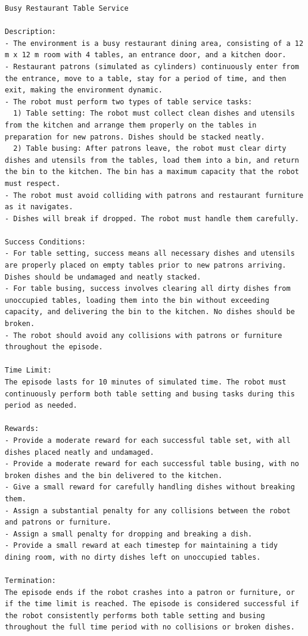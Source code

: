 \begin{lstlisting}[language={}]
Busy Restaurant Table Service

Description: 
- The environment is a busy restaurant dining area, consisting of a 12 m x 12 m room with 4 tables, an entrance door, and a kitchen door.
- Restaurant patrons (simulated as cylinders) continuously enter from the entrance, move to a table, stay for a period of time, and then exit, making the environment dynamic.
- The robot must perform two types of table service tasks:
  1) Table setting: The robot must collect clean dishes and utensils from the kitchen and arrange them properly on the tables in preparation for new patrons. Dishes should be stacked neatly.
  2) Table busing: After patrons leave, the robot must clear dirty dishes and utensils from the tables, load them into a bin, and return the bin to the kitchen. The bin has a maximum capacity that the robot must respect.
- The robot must avoid colliding with patrons and restaurant furniture as it navigates.
- Dishes will break if dropped. The robot must handle them carefully.

Success Conditions:
- For table setting, success means all necessary dishes and utensils are properly placed on empty tables prior to new patrons arriving. Dishes should be undamaged and neatly stacked.
- For table busing, success involves clearing all dirty dishes from unoccupied tables, loading them into the bin without exceeding capacity, and delivering the bin to the kitchen. No dishes should be broken.
- The robot should avoid any collisions with patrons or furniture throughout the episode.

Time Limit:
The episode lasts for 10 minutes of simulated time. The robot must continuously perform both table setting and busing tasks during this period as needed.

Rewards:
- Provide a moderate reward for each successful table set, with all dishes placed neatly and undamaged.
- Provide a moderate reward for each successful table busing, with no broken dishes and the bin delivered to the kitchen.
- Give a small reward for carefully handling dishes without breaking them.
- Assign a substantial penalty for any collisions between the robot and patrons or furniture.
- Assign a small penalty for dropping and breaking a dish.
- Provide a small reward at each timestep for maintaining a tidy dining room, with no dirty dishes left on unoccupied tables.

Termination:
The episode ends if the robot crashes into a patron or furniture, or if the time limit is reached. The episode is considered successful if the robot consistently performs both table setting and busing throughout the full time period with no collisions or broken dishes.
\end{lstlisting}
